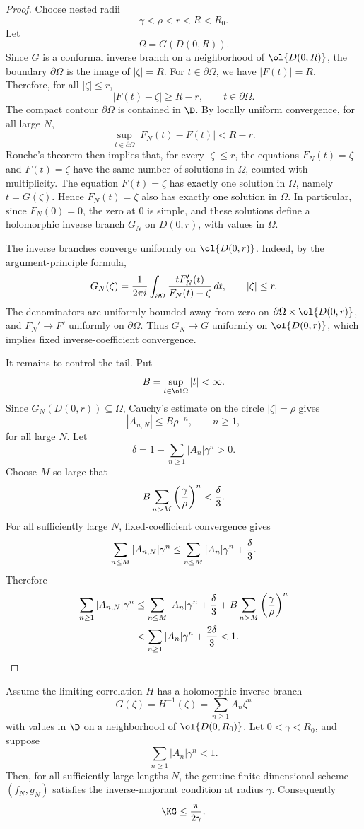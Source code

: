 \begin{proof}
Choose nested radii
\[
  \gamma<\rho<r<R<R_0.
\]
Let
\[
  \Omega=G(D(0,R)).
\]
Since $G$ is a conformal inverse branch on a neighborhood of $\ol{D(0,R)}$, the boundary $\partial\Omega$ is the image of $|\zeta|=R$.  For $t\in\partial\Omega$, we have $|F(t)|=R$.  Therefore, for all $|\zeta|\le r$,
\[
  |F(t)-\zeta|\ge R-r,
  \qquad t\in\partial\Omega.
\]
The compact contour $\partial\Omega$ is contained in $\D$.  By locally uniform convergence, for all large $N$,
\[
  \sup_{t\in\partial\Omega}|F_N(t)-F(t)|<R-r.
\]
Rouche's theorem then implies that, for every $|\zeta|\le r$, the equations $F_N(t)=\zeta$ and $F(t)=\zeta$ have the same number of solutions in $\Omega$, counted with multiplicity.  The equation $F(t)=\zeta$ has exactly one solution in $\Omega$, namely $t=G(\zeta)$.  Hence $F_N(t)=\zeta$ also has exactly one solution in $\Omega$.  In particular, since $F_N(0)=0$, the zero at $0$ is simple, and these solutions define a holomorphic inverse branch $G_N$ on $D(0,r)$, with values in $\Omega$.

The inverse branches converge uniformly on $\ol{D(0,r)}$.  Indeed, by the argument-principle formula,
\[
  G_N(\zeta)= {1\over 2\pi i}\int_{\partial\Omega}
  {tF_N'(t)\over F_N(t)-\zeta}\,dt,
  \qquad |\zeta|\le r.
\]
The denominators are uniformly bounded away from zero on $\partial\Omega\times\ol{D(0,r)}$, and $F_N'\to F'$ uniformly on $\partial\Omega$.  Thus $G_N\to G$ uniformly on $\ol{D(0,r)}$, which implies fixed inverse-coefficient convergence.

It remains to control the tail.  Put
\[
  B=\sup_{t\in\ol\Omega}|t|<\infty.
\]
Since $G_N(D(0,r))\subseteq\Omega$, Cauchy's estimate on the circle $|\zeta|=\rho$ gives
\[
  |A_{n,N}|\le B\rho^{-n},
  \qquad n\ge1,
\]
for all large $N$.  Let
\[
  \delta=1-\sum_{n\ge1}|A_n|\gamma^n>0.
\]
Choose $M$ so large that
\[
  B\sum_{n>M}\left({\gamma\over\rho}\right)^n< {\delta\over3}.
\]
For all sufficiently large $N$, fixed-coefficient convergence gives
\[
  \sum_{n\le M}|A_{n,N}|\gamma^n
  \le \sum_{n\le M}|A_n|\gamma^n+{\delta\over3}.
\]
Therefore
\begin{align*}
  \sum_{n\ge1}|A_{n,N}|\gamma^n
  &\le \sum_{n\le M}|A_n|\gamma^n+{\delta\over3}
  +B\sum_{n>M}\left({\gamma\over\rho}\right)^n\\
  &< \sum_{n\ge1}|A_n|\gamma^n+{2\delta\over3}<1.
\end{align*}
\end{proof}

\begin{corollary}\label{cor:finite-scheme}
Assume the limiting correlation $H$ has a holomorphic inverse branch
\[
  G(\zeta)=H^{-1}(\zeta)=\sum_{n\ge1}A_n\zeta^n
\]
with values in $\D$ on a neighborhood of $\ol{D(0,R_0)}$.  Let $0<\gamma<R_0$, and suppose
\[
  \sum_{n\ge1}|A_n|\gamma^n<1.
\]
Then, for all sufficiently large lengths $N$, the genuine finite-dimensional scheme $(f_N,g_N)$ satisfies the inverse-majorant condition at radius $\gamma$.  Consequently
\[
  \KG\le {\pi\over2\gamma}.
\]
\end{corollary}

